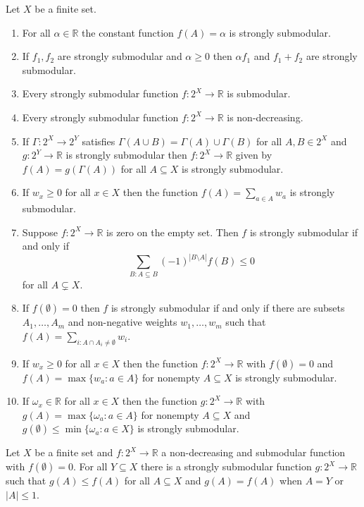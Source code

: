 \documentclass[10pt,a4paper]{amsart}
\renewcommand{\Re}{\mathbb{R}}
\begin{document}
\begin{proposition} \label{prop:basic_strong}
Let $X$ be a finite set.
\begin{enumerate}[label=(\roman*)]
\item For all $\alpha \in \Re$ the constant function $f(A) = \alpha$ is strongly submodular.
\item If $f_1,f_2$ are strongly submodular and $\alpha \geq 0$ then $\alpha f_1$ and $f_1 + f_2$ are strongly submodular.
\item Every strongly submodular function $f:2^X \rightarrow \Re$  is submodular.
\item Every strongly submodular function $f:2^X \rightarrow \Re$ is non-decreasing. %
\item If $\Gamma:2^X \rightarrow 2^Y$ satisfies $\Gamma(A \cup B) = \Gamma(A) \cup \Gamma(B)$ for all $A,B \in 2^X$ and $g:2^Y \rightarrow \Re$ is strongly submodular then $f:2^X \rightarrow \Re$ given by $f(A) = g(\Gamma(A))$ for all $A \subseteq X$ is strongly submodular. %
\item If $w_x \geq 0$ for all $x \in X$ then the function $f(A) = \sum_{a \in A} w_a$ is strongly submodular. %
\item Suppose $f:2^X \rightarrow \Re$ is zero on the empty set. Then $f$ is strongly submodular if and only if 
\begin{equation}
\sum_{B:A \subseteq B} (-1)^{|B \setminus A|} f(B) \leq 0 \label{eq:strong_moebius}
\end{equation}
for all $A \subsetneq X$.  %
\item If $f(\emptyset) = 0$ then $f$ is strongly submodular if and only if there are subsets $A_1,\ldots,A_m$ and non-negative weights $w_1,\ldots,w_m$ such that $f(A) = \sum_{i:A \cap A_i \neq \emptyset} w_i$. 
\item If $w_x \geq 0$ for all $x \in X$ then the function $f:2^X \rightarrow \Re$ with $f(\emptyset) = 0$ and $f(A) = \max\{w_a:a \in A\}$ for nonempty $A \subseteq X$ is strongly submodular. 
\item If $\omega_x \in \Re$ for all $x \in X$ then the function $g:2^X \rightarrow \Re$ with $g(A) = \max\{\omega_a:a \in A\}$ for nonempty $A \subseteq X$ and 
$g(\emptyset) \leq  \min\{\omega_a:a \in X\}$  is strongly submodular. 
\end{enumerate}
\end{proposition}

 \begin{theorem} \label{thm:submodular_match}
 Let $X$ be a finite set and $f:2^X \rightarrow \Re$ a non-decreasing and  submodular function with $f(\emptyset) = 0$. For all  $Y \subseteq X$ there is a strongly submodular function $g:2^X \rightarrow \Re$ such that $g(A) \leq f(A)$ for all $A \subseteq X$ and $g(A) = f(A)$ when $A =Y$ or $|A| \leq 1$. 
 \end{theorem}
\end{document}
